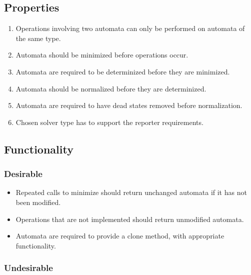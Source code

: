 \documentclass[letterpaper,11pt]{article}
\begin{document}
\subsection{Properties}

\begin{enumerate}
\item{Operations involving two automata can only be performed on automata of
    the same type.}
\item{Automata should be minimized before operations occur.}
\item{Automata are required to be determinized before they are minimized.}
\item{Automata should be normalized before they are determinized.}
\item{Automata are required to have dead states removed before normalization.}
\item{Chosen solver type has to support the reporter requirements.}
\end{enumerate}

\subsection{Functionality}

\subsubsection{Desirable}

\begin{itemize}
\item{Repeated calls to minimize should return unchanged automata if it has not
    been modified.}
\item{Operations that are not implemented should return unmodified automata.}
\item{Automata are required to provide a clone method, with appropriate
    functionality.}
\end{itemize}
\subsubsection{Undesirable}

\nocite{*}


\end{document}
